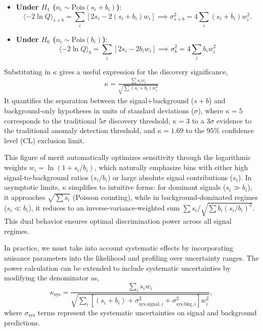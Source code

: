 \begin{itemize}
	\item \textbf{Under $H_1$ ($n_i \sim \text{Pois}(s_i + b_i)$)}:
	\begin{equation}
	\langle -2\ln Q \rangle_{s+b} = \sum_i \left[2s_i - 2(s_i + b_i)w_i\right]
	\implies \sigma^2_{s+b} = 4\sum_i (s_i + b_i) w_i^2.
	\end{equation}

	\item \textbf{Under $H_0$ ($n_i \sim \text{Pois}(b_i)$)}:
	\begin{equation}
	\langle -2\ln Q \rangle_{b} = \sum_i \left[2s_i - 2b_i w_i\right]
	\implies \sigma^2_{b} = 4\sum_i b_i w_i^2
	\end{equation}
\end{itemize}
Substituting in $\kappa$ gives a useful expression for the discovery significance,
\begin{align}
\kappa = \frac{\sum s_i w_i}{\sqrt{\sum (s_i + b_i) w_i^2}}
\end{align}
It quantifies the separation between the signal+background ($s+b$) and background-only hypotheses in units of standard deviations ($\sigma$), where $\kappa = 5$ corresponds to the traditional $5\sigma$ discovery threshold, $\kappa =3$ to a $3\sigma$ evidence to the traditional anomaly detection threshold, and $\kappa = 1.69$ to the $95\%$ confidence level (CL) exclusion limit.


This figure of merit automatically optimizes sensitivity through the logarithmic weights $w_i = \ln(1 + s_i/b_i)$, which naturally emphasize bins with either high signal-to-background ratios ($s_i/b_i$) or large absolute signal contributions ($s_i$). In asymptotic limits, $\kappa$ simplifies to intuitive forms: for dominant signals ($s_i \gg b_i$), it approaches $\sqrt{\sum s_i}$ (Poisson counting), while in background-dominated regimes ($s_i \ll b_i$), it reduces to an inverse-variance-weighted sum $\sum s_i / \sqrt{\sum b_i (s_i/b_i)^2}$. This dual behavior ensures optimal discrimination power across all signal regimes.

In practice, we must take into account systematic effects by incorporating nuisance parameters into the likelihood and profiling over uncertainty ranges. The power calculation can be extended to include systematic uncertainties by modifying the denominator as,
\begin{equation}
	\boxed{
	\kappa_{\text{sys}} = \frac{\sum_i s_i w_i}{\sqrt{\sum_i \left[(s_i + b_i) + \sigma^2_{\text{sys,signal},i} + \sigma^2_{\text{sys,bkg},i}\right] w_i^2}},
}
\label{eq:kappa_with_systematics}
\end{equation}
where $\sigma_{\text{sys}}$ terms represent the systematic uncertainties on signal and background predictions.

